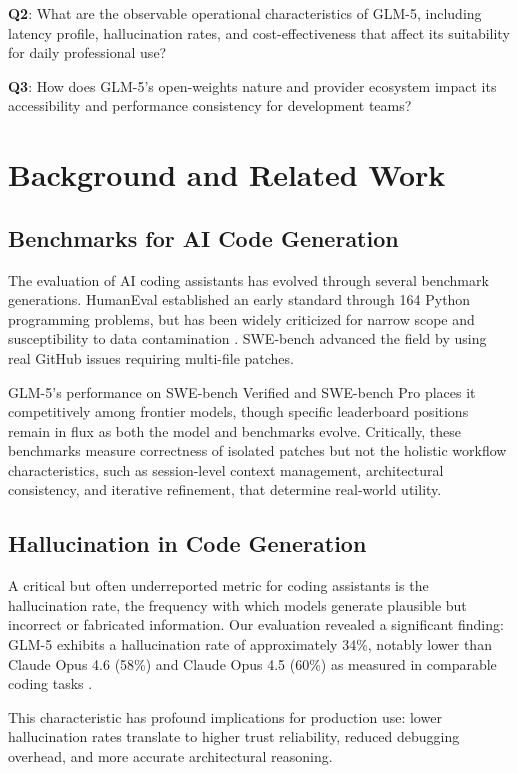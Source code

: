 \documentclass[conference]{IEEEtran}
\begin{document}
\textbf{Q2}: What are the observable operational characteristics of GLM-5, including latency profile, hallucination rates, and cost-effectiveness that affect its suitability for daily professional use?

\textbf{Q3}: How does GLM-5's open-weights nature and provider ecosystem impact its accessibility and performance consistency for development teams?

\section{Background and Related Work}

\subsection{Benchmarks for AI Code Generation}
The evaluation of AI coding assistants has evolved through several benchmark generations. HumanEval \cite{chen2021evaluating} established an early standard through 164 Python programming problems, but has been widely criticized for narrow scope and susceptibility to data contamination \cite{fryer2024hallucination}. SWE-bench \cite{jimenez2024swebench} advanced the field by using real GitHub issues requiring multi-file patches.

GLM-5's performance on SWE-bench Verified and SWE-bench Pro places it competitively among frontier models, though specific leaderboard positions remain in flux as both the model and benchmarks evolve. Critically, these benchmarks measure correctness of isolated patches but not the holistic workflow characteristics, such as session-level context management, architectural consistency, and iterative refinement, that determine real-world utility.

\subsection{Hallucination in Code Generation}
A critical but often underreported metric for coding assistants is the hallucination rate, the frequency with which models generate plausible but incorrect or fabricated information. Our evaluation revealed a significant finding: GLM-5 exhibits a hallucination rate of approximately 34\%, notably lower than Claude Opus 4.6 (58\%) and Claude Opus 4.5 (60\%) as measured in comparable coding tasks \cite{fryer2024hallucination}.

This characteristic has profound implications for production use: lower hallucination rates translate to higher trust reliability, reduced debugging overhead, and more accurate architectural reasoning.
\end{document}

